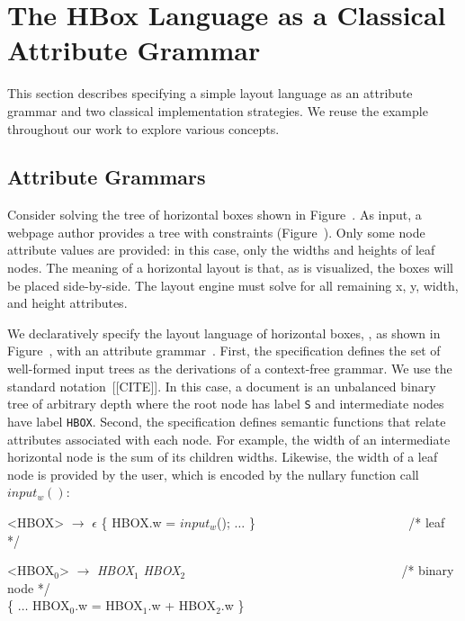 \section{The HBox Language as a Classical Attribute Grammar}

This section describes specifying a simple layout language as an attribute grammar and two classical implementation strategies. We reuse the example throughout our work to explore various concepts.



\subsection{Attribute Grammars}

Consider solving the tree of horizontal boxes shown in Figure~. As input, a webpage author provides a tree with constraints (Figure~). Only some node attribute values are provided: in this case, only the widths and heights of leaf nodes. The meaning of a horizontal layout is that, as is visualized, the boxes will be placed side-by-side. The layout engine must solve for all remaining x, y, width, and height attributes. 

We declaratively specify the layout language of horizontal boxes, \hlang{},  as shown in Figure~, with an attribute grammar~\cite{oag,Meyerovich:2010,htmlag}. First, the specification defines the set of well-formed input trees as the derivations of a context-free grammar. We use the standard notation~[[CITE]]. In this case, a document is an unbalanced binary tree of arbitrary depth where the root node has label \texttt{S} and intermediate nodes have label \texttt{HBOX}. Second, the specification defines semantic functions that relate attributes associated with each node. For example, the width of an intermediate horizontal node is the sum of its children widths. Likewise, the width of a leaf node is provided by the user, which is encoded by the nullary function call $input_w()$:


\begin{grammar}
<HBOX> $\rightarrow$ $\epsilon$ \{ HBOX.w = $input_w$(); $\ldots$ \} ~~~~~~~~~~~~~~~~~~~~~~~ /* leaf */

<HBOX$_0$> $\rightarrow$ \emph{HBOX$_1$} \emph{HBOX$_2$} ~~~~~~~~~~~~~~~~~~~~~~~~~~~~~~~~~ /* binary node */\\
\{ $\ldots$ HBOX$_0$.w = HBOX$_1$.w + HBOX$_2$.w \} 
\end{grammar}


